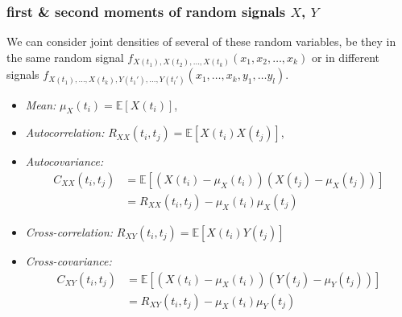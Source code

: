 \documentclass{beamer}
\begin{document}
\begin{frame}[fragile]
	\frametitle{first \& second moments of random signals $X$, $Y$}
	We can consider joint densities of several of these random variables, be they in the same random signal \textcolor{title}{$f_{X(t_1), X(t_2),\ldots,X(t_k)}(x_1, x_2, \ldots, x_k)$} or in different signals \textcolor{title}{$f_{X(t_1), \ldots, X(t_k), Y(t_1'),\ldots,Y(t_l')}(x_1, \ldots, x_k, y_1, \ldots y_l)$}.
	\begin{itemize}
		\item \emph{Mean:} $\mu_{X}(t_i) = \mathbb{E}[X(t_i)]$,
		\item \emph{Autocorrelation:} $R_{XX}(t_i,t_j) = \mathbb{E}[X(t_i)X(t_j)]$,
		\item \emph{Autocovariance:} \begin{align*} C_{XX}(t_i,t_j) &= \mathbb{E}[(X(t_i)-\mu_X(t_i))(X(t_j)-\mu_X(t_j))]\\ &= R_{XX}(t_i,t_j)-\mu_X(t_i)\mu_X(t_j)\end{align*}
			\item \emph{Cross-correlation:} $R_{XY}(t_i,t_j) = \mathbb{E}[X(t_i)Y(t_j)]$
		\item \emph{Cross-covariance:}\begin{align*} C_{XY}(t_i,t_j) &= \mathbb{E}[(X(t_i)-\mu_X(t_i))(Y(t_j)-\mu_Y(t_j))]\\ &= R_{XY}(t_i,t_j)-\mu_X(t_i)\mu_Y(t_j)\end{align*}

	\end{itemize}
\end{frame}
\end{document}
